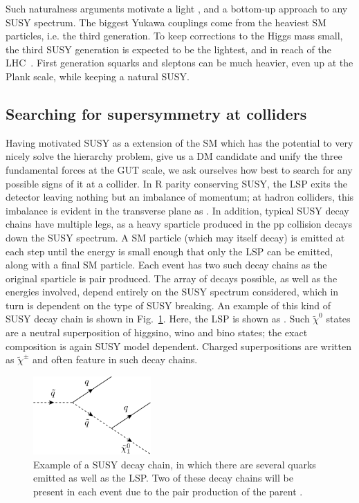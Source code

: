 Such naturalness arguments motivate a light \sTop{}, and a bottom-up approach to any \ac{SUSY} spectrum.
The biggest Yukawa couplings come from the heaviest \ac{SM} particles, i.e. the third generation.  
To keep corrections to the Higgs mass small, the third \ac{SUSY} generation is expected to be the lightest, 
and in reach of the \ac{LHC}~\cite{natSUSY3,natSUSY4}.
First generation squarks and sleptons can be much heavier, even up at the Plank scale, 
while keeping a natural \ac{SUSY}.

\subsection{Searching for supersymmetry at colliders}
\label{sec:susycolliders}

Having motivated \ac{SUSY} as a extension of the \ac{SM} which has the potential to very nicely solve the hierarchy problem, give us a \ac{DM} candidate and unify the three fundamental forces at the \ac{GUT} scale, we ask ourselves how best to search for any possible signs of it at a collider.
In R parity conserving \ac{SUSY}, the \ac{LSP} exits the detector leaving nothing but an imbalance of momentum; at hadron colliders, this imbalance is evident in the transverse plane as \MET.
In addition, typical \ac{SUSY} decay chains have multiple legs, as a heavy sparticle produced in the pp collision decays down the \ac{SUSY} spectrum. 
A \ac{SM} particle (which may itself decay) is emitted at each step until the energy is small enough that only the \ac{LSP} can be emitted, along with a final \ac{SM} particle.
Each event has two such decay chains as the original sparticle is pair produced. 
The array of decays possible, as well as the energies involved, depend entirely on the \ac{SUSY} spectrum considered, which in turn is dependent on the type of \ac{SUSY} breaking.
An example of this kind of \ac{SUSY} decay chain is shown in Fig.~\ref{fig:SUSYdecaychain}. 
Here, the LSP is shown as \chiOneZero. 
Such $\tilde{\chi}^{0}$ states are a neutral superposition of higgsino, wino and bino states; the exact composition is again \ac{SUSY} model dependent.
Charged superpositions are written as $\tilde{\chi}^{\pm}$ and often feature in such decay chains.

\begin{figure}[htbp]
  \begin{center}
  \includegraphics[width=0.4\textwidth]{Figures/theory/susyDecayChain.pdf}
  \caption{Example of a \ac{SUSY} decay chain, in which there are several quarks emitted as well as the \ac{LSP}. Two of these decay chains will be present in each event due to the pair production of the parent \squark.}
   \label{fig:SUSYdecaychain}
   \end{center}
\end{figure}


